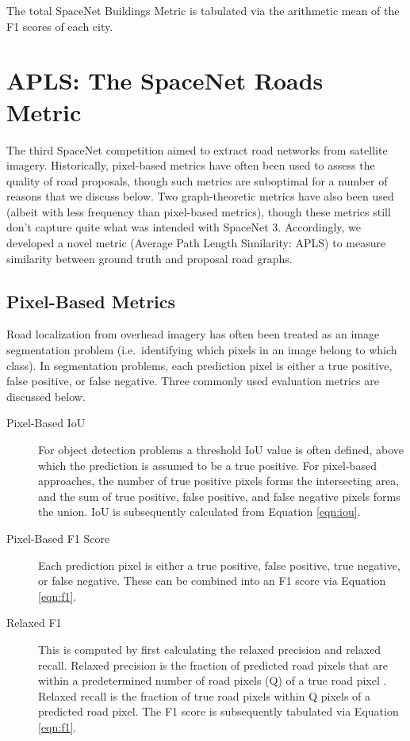 \documentclass{article}
\begin{document}
The total SpaceNet Buildings Metric is tabulated via the arithmetic mean of the F1 scores of each city. 


\section{APLS: The SpaceNet Roads Metric}

The third SpaceNet competition aimed to extract road networks from satellite imagery.  Historically, pixel-based metrics have often been used to assess the quality of road proposals, though such metrics are suboptimal for a number of reasons that we discuss below.  Two graph-theoretic metrics have also been used (albeit with less frequency than pixel-based metrics), though these metrics still don't capture quite what was intended with SpaceNet 3.  Accordingly, we developed a novel metric (Average Path Length Similarity: APLS) \cite{apls} to measure similarity between ground truth and proposal road graphs. 

\subsection{Pixel-Based Metrics}

Road localization from overhead imagery has often been treated as an image segmentation problem (i.e.~identifying which pixels in an image belong to which class).  In segmentation problems, each prediction pixel is either a true positive,
false positive,
or false negative.
Three commonly used evaluation metrics are discussed below.

\begin{description}

\item[Pixel-Based IoU]


For object detection problems a threshold IoU value is often defined, above which the prediction is assumed to be a true positive.  For pixel-based approaches, the number of true positive pixels forms the intersecting area, and the sum of true positive, false positive, and false negative pixels forms the union.  IoU is subsequently calculated from Equation \ref{eqn:iou}.

\item[Pixel-Based F1 Score]
Each prediction pixel is either a true positive, false positive, true negative, or false negative. These can be combined into an F1 score via Equation \ref{eqn:f1}.  

\item[Relaxed F1]
This is computed by first calculating the relaxed precision and relaxed recall.  Relaxed precision is the fraction of predicted road pixels that are within a predetermined number of road pixels (Q) of a true road pixel \cite{relaxedf1}.  Relaxed recall is the fraction of true road pixels within Q pixels of a predicted road pixel.  The F1 score is subsequently tabulated via Equation  \ref{eqn:f1}.


\end{description}
\end{document}

